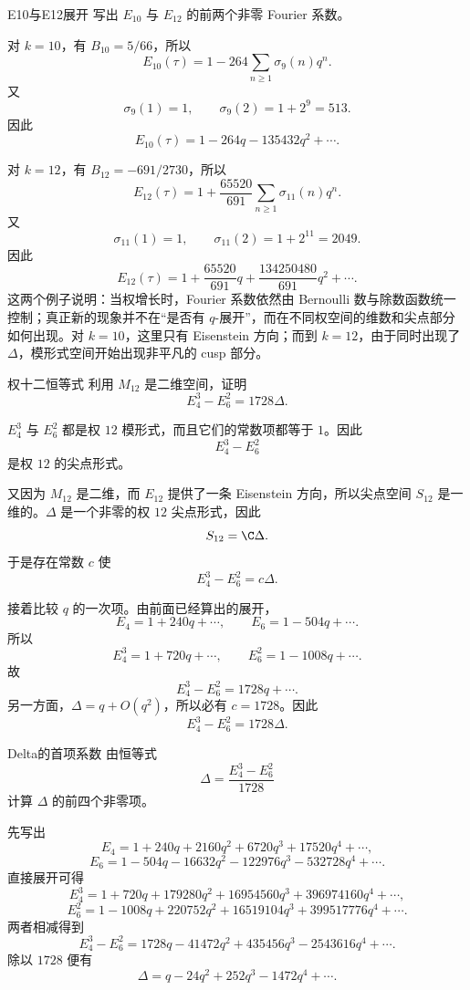 \begin{problem}{E10与E12展开}
\medium
写出 $E_{10}$ 与 $E_{12}$ 的前两个非零 Fourier 系数。
\end{problem}
\begin{solution}
对 $k=10$，有 $B_{10}=5/66$，所以
\[
E_{10}(\tau)=1-264\sum_{n\ge1}\sigma_9(n)q^n.
\]
又
\[
\sigma_9(1)=1,\qquad \sigma_9(2)=1+2^9=513.
\]
因此
\[
E_{10}(\tau)=1-264q-135432q^2+\cdots.
\]

对 $k=12$，有 $B_{12}=-691/2730$，所以
\[
E_{12}(\tau)=1+\frac{65520}{691}\sum_{n\ge1}\sigma_{11}(n)q^n.
\]
又
\[
\sigma_{11}(1)=1,
\qquad
\sigma_{11}(2)=1+2^{11}=2049.
\]
因此
\[
E_{12}(\tau)=1+\frac{65520}{691}q+\frac{134250480}{691}q^2+\cdots.
\]
这两个例子说明：当权增长时，Fourier 系数依然由 Bernoulli 数与除数函数统一控制；真正新的现象并不在“是否有 $q$-展开”，而在不同权空间的维数和尖点部分如何出现。对 $k=10$，这里只有 Eisenstein 方向；而到 $k=12$，由于同时出现了 $\Delta$，模形式空间开始出现非平凡的 cusp 部分。
\end{solution}

\begin{problem}{权十二恒等式}
\medium
利用 $M_{12}$ 是二维空间，证明
\[
E_4^3-E_6^2=1728\Delta.
\]
\end{problem}
\begin{solution}
$E_4^3$ 与 $E_6^2$ 都是权 $12$ 模形式，而且它们的常数项都等于 $1$。因此
\[
E_4^3-E_6^2
\]
是权 $12$ 的尖点形式。

又因为 $M_{12}$ 是二维，而 $E_{12}$ 提供了一条 Eisenstein 方向，所以尖点空间 $S_{12}$ 是一维的。$\Delta$ 是一个非零的权 $12$ 尖点形式，因此
\[
S_{12}=\C\Delta.
\]
于是存在常数 $c$ 使
\[
E_4^3-E_6^2=c\Delta.
\]

接着比较 $q$ 的一次项。由前面已经算出的展开，
\[
E_4=1+240q+\cdots,
\qquad
E_6=1-504q+\cdots.
\]
所以
\[
E_4^3=1+720q+\cdots,
\qquad
E_6^2=1-1008q+\cdots.
\]
故
\[
E_4^3-E_6^2=1728q+\cdots.
\]
另一方面，$\Delta=q+O(q^2)$，所以必有 $c=1728$。因此
\[
E_4^3-E_6^2=1728\Delta.
\]
\end{solution}

\begin{problem}{Delta的首项系数}
\medium
由恒等式
\[
\Delta=\frac{E_4^3-E_6^2}{1728}
\]
计算 $\Delta$ 的前四个非零项。
\end{problem}
\begin{solution}
先写出
\[
E_4=1+240q+2160q^2+6720q^3+17520q^4+\cdots,
\]
\[
E_6=1-504q-16632q^2-122976q^3-532728q^4+\cdots.
\]
直接展开可得
\[
E_4^3=1+720q+179280q^2+16954560q^3+396974160q^4+\cdots,
\]
\[
E_6^2=1-1008q+220752q^2+16519104q^3+399517776q^4+\cdots.
\]
两者相减得到
\[
E_4^3-E_6^2=1728q-41472q^2+435456q^3-2543616q^4+\cdots.
\]
除以 $1728$ 便有
\[
\Delta=q-24q^2+252q^3-1472q^4+\cdots.
\]
\end{solution}

